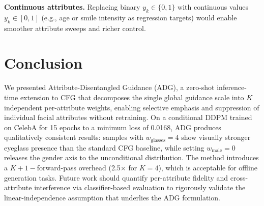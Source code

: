 \documentclass{article}
\begin{document}
\textbf{Continuous attributes.} Replacing binary $y_k \in \{0,1\}$ with continuous values $y_k \in [0,1]$ (e.g., age or smile intensity as regression targets) would enable smoother attribute sweeps and richer control.

\section{Conclusion}
\label{sec:conclusion}

We presented Attribute-Disentangled Guidance (ADG), a zero-shot inference-time extension to CFG that decomposes the single global guidance scale into $K$ independent per-attribute weights, enabling selective emphasis and suppression of individual facial attributes without retraining. On a conditional DDPM trained on CelebA for 15 epochs to a minimum loss of 0.0168, ADG produces qualitatively consistent results: samples with $w_{\text{glasses}}{=}4$ show visually stronger eyeglass presence than the standard CFG baseline, while setting $w_{\text{male}}{=}0$ releases the gender axis to the unconditional distribution. The method introduces a $K{+}1{-}$forward-pass overhead (2.5$\times$ for $K{=}4$), which is acceptable for offline generation tasks. Future work should quantify per-attribute fidelity and cross-attribute interference via classifier-based evaluation to rigorously validate the linear-independence assumption that underlies the ADG formulation.

\setlength{\bibsep}{2pt plus 0.3ex}
{\scriptsize


}
\end{document}
